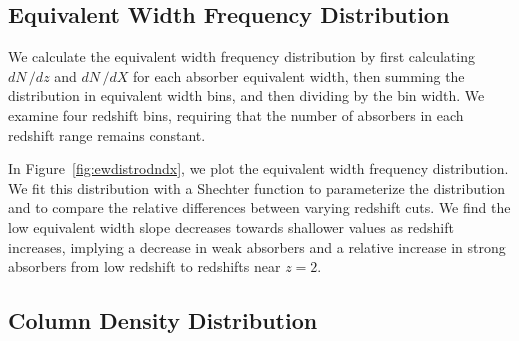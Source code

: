 \documentclass[linenumbers,twocolumn]{aastex61}
\begin{document}
\subsection{Equivalent Width Frequency Distribution}
\label{sec:ewdistro}

We calculate the equivalent width frequency distribution by first calculating $dN\,/dz$ and $dN\,/dX$ for each absorber equivalent width, then summing the distribution in equivalent width bins, and then dividing by the bin width. We examine four redshift bins, requiring that the number of absorbers in each redshift range remains constant.

In Figure~\ref{fig:ewdistrodndx}, we plot the equivalent width frequency distribution. We fit this distribution with a Shechter function to parameterize the distribution and to compare the relative differences between varying redshift cuts. We find the low equivalent width slope decreases towards shallower values as redshift increases, implying a decrease in weak {\CIV} absorbers and a relative increase in strong {\CIV} absorbers from low redshift to redshifts near $z = 2$.

\begin{figure*}[bth]
\caption{The equivalent width distribution of ${\CIV}$ absorbers, defined as the comoving line density ($\frac{dN}{dX}$) in each equivalent width bin divided by the bin width. We fit this distribution with a Schechter function, capturing the self-similar power law behavior of the distribution before the exponential cutoff limiting the size of ${\CIV}$ absorbers.}
\label{fig:ewdistrodndz}
\end{figure*}

\begin{figure*}[bth]
\caption{The equivalent width distribution of {\CIV} absorbers, defined as the comoving line density ($\frac{dN}{dX}$) in each equivalent width bin divided by the bin width. We fit this distribution with a Schechter function, capturing the self-similar power law behavior of the distribution before the exponential cutoff limiting the size of {\CIV} absorbers.}
\label{fig:ewdistrodndx}
\end{figure*}

\subsection{Column Density Distribution}
\label{sec:logndistro}
\end{document}
